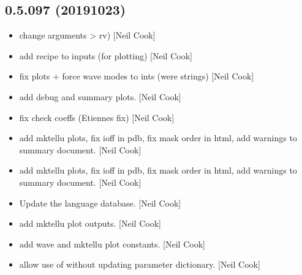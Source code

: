 \documentclass[a4paper,10pt,english]{report}
\begin{document}
\subsection{0.5.097 (2019\sphinxhyphen{}10\sphinxhyphen{}23)}
\label{\detokenize{misc/changelog:id64}}\begin{itemize}
\item {} 
 \sphinxhyphen{} change arguments  \textendash{}\textgreater{} rv) {[}Neil
Cook{]}

\item {} 
 \sphinxhyphen{} add recipe to inputs (for plotting)
{[}Neil Cook{]}

\item {} 
 \sphinxhyphen{} fix plots + force wave modes to ints (were
strings) {[}Neil Cook{]}

\item {} 
 \sphinxhyphen{} add debug and summary plots. {[}Neil
Cook{]}

\item {} 
 \sphinxhyphen{} fix check coeffs (Etiennes fix)
{[}Neil Cook{]}

\item {} 
 \sphinxhyphen{} add mktellu plots, fix ioff in pdb, fix mask order in
html, add warnings to summary document. {[}Neil Cook{]}

\item {} 
 \sphinxhyphen{} add mktellu plots, fix ioff in pdb, fix mask order in
html, add warnings to summary document. {[}Neil Cook{]}

\item {} 
Update the language database. {[}Neil Cook{]}

\item {} 
 \sphinxhyphen{} add mktellu plot
outputs. {[}Neil Cook{]}

\item {} 
 \sphinxhyphen{} add wave and mktellu plot
constants. {[}Neil Cook{]}

\item {} 
 \sphinxhyphen{} allow use of  without updating parameter
dictionary. {[}Neil Cook{]}

\end{itemize}
\end{document}
